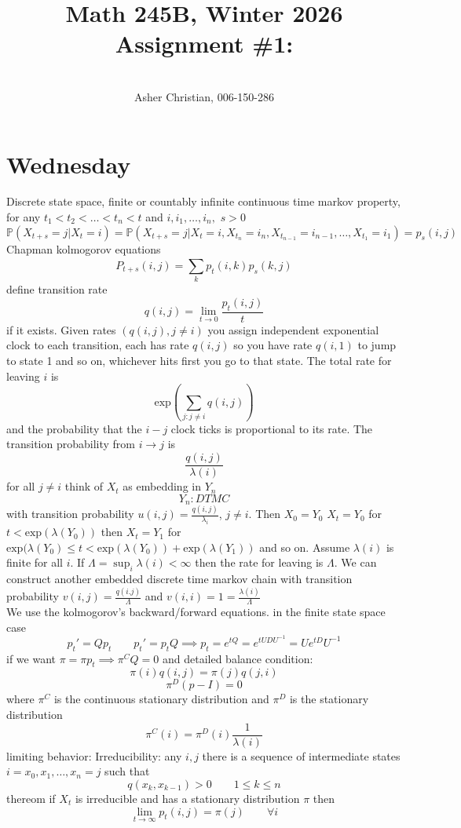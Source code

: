 \documentclass[11pt]{article}
\newcommand{\cnum}{Math 245B}
\newcommand{\ced}{Winter 2026}
\newcommand{\ctitle}[4]{\title{\vspace{-0.5in}\cnum, \ced\\Assignment #1: #2}\author{\vspace{-0.35in}\\#3, #4}}
\begin{document}
\ctitle{\#1}{}{Asher Christian}{006-150-286}
\date{}
\maketitle
\section{Wednesday}
Discrete state space, finite or countably infinite continuous time markov property, for any $t_1<t_2<\dots<t_n< t$ and $i,i_1,\dots,i_n,$
$s > 0$
\[
    \mathbb{P}(X_{t+s} = j | X_t = i) = \mathbb{P}(X_{t+s} = j | X_t = i, X_{t_n} = i_n, X_{t_{n-1}} = i_{n-1}, \dots, X_{t_1} = i_1) = p_s(i,j)
\] 
Chapman kolmogorov equations
\[
    P_{t+s}(i,j) = \sum_{k}^{}p_t(i,k)p_s(k,j)
\] 
define transition rate
\[
q(i,j) = \lim_{t\to 0} \frac{p_t(i,j)}{t}
\] 
if it exists. Given rates $(q(i,j), j \ne i)$ you assign independent exponential clock to each transition, each has rate  $q(i,j)$
so you have rate  $q(i,1)$ to jump to state 1 and so on, whichever hits first you go to that state.
The total rate for leaving  $i$ is
\[
\text{exp}(\sum_{j : j \ne i}^{}q(i,j))
\] 
and the probability that the $i-j$ clock ticks is proportional to its rate.
The transition probability from  $i \rightarrow j$ is
\[
\frac{q(i,j)}{\lambda(i)}
\] 
for all $j \ne i$ think of  $X_t$ as embedding in  $ Y_n$
 \[
Y_n : DTMC
\] 
with transition probability $u(i,j) = \frac{q(i,j)}{\lambda_i}$, $j \ne i$. Then  $X_0 = Y_0$ $X_t = Y_0$ for $t < \text{exp}(\lambda(Y_0))$ then
$X_t = Y_1$ for $\text{exp}(\lambda(Y_0) \le t < \text{exp}(\lambda(Y_0)) + \text{exp}(\lambda(Y_1))$ and so on.
Assume $\lambda(i)$ is finite for all $i$. If  $\Lambda = \sup_i \lambda(i) < \infty$ then the rate
for leaving is $\Lambda$. We can construct another embedded discrete time markov chain
with transition probability  $v(i,j) = \frac{q(i.j)}{\Lambda}$ and $v(i,i) = 1 = \frac{\lambda(i)}{\Lambda}$ \\
We use the kolmogorov's backward/forward equations. in the finite state space case
\[
p_t' = Qp_t \qquad p_t' = p_tQ \implies p_t = e^{tQ} = e^{tU D U^{-1}} = U e^{tD} U^{-1}
\] 
if we want $\pi = \pi p_t \implies \pi^{C} Q = 0$ and detailed balance condition:
\[
\pi(i)q(i,j) = \pi(j)q(j,i)
\] 
\[
\pi^{D}(p-I) = 0
\] 
where $\pi^{C}$ is the continuous stationary distribution and $\pi^{D}$ is the stationary distribution
\[
\pi^{C}(i) = \pi^{D}(i) \frac{1}{\lambda(i)}
\] 
limiting behavior: Irreducibility: any $i,j$ there is a sequence of intermediate states  $i=x_0,x_1,\dots,x_n=j$ such that
\[
    q(x_k,x_{k-1}) > 0  \qquad 1 \le k \le n
\] 
thereom if $X_t$ is irreducible and has a stationary distribution  $\pi$ then
\[
\lim_{t\to \infty}p_t(i,j) = \pi(j) \qquad \forall i
\] 
\end{document}
